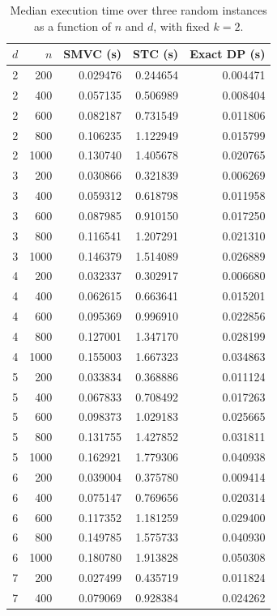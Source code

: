 \begin{table}[t]
\centering
\scriptsize
\caption{Median execution time over three random instances as a function of $n$ and $d$, with fixed $k=2$.}
\label{tab:experiment-4-runtime}
\begin{tabular}{rrrrr}
\toprule
$d$ & $n$ & SMVC (s) & STC (s) & Exact DP (s) \\
\midrule
2 & 200 & 0.029476 & 0.244654 & 0.004471 \\
2 & 400 & 0.057135 & 0.506989 & 0.008404 \\
2 & 600 & 0.082187 & 0.731549 & 0.011806 \\
2 & 800 & 0.106235 & 1.122949 & 0.015799 \\
2 & 1000 & 0.130740 & 1.405678 & 0.020765 \\
3 & 200 & 0.030866 & 0.321839 & 0.006269 \\
3 & 400 & 0.059312 & 0.618798 & 0.011958 \\
3 & 600 & 0.087985 & 0.910150 & 0.017250 \\
3 & 800 & 0.116541 & 1.207291 & 0.021310 \\
3 & 1000 & 0.146379 & 1.514089 & 0.026889 \\
4 & 200 & 0.032337 & 0.302917 & 0.006680 \\
4 & 400 & 0.062615 & 0.663641 & 0.015201 \\
4 & 600 & 0.095369 & 0.996910 & 0.022856 \\
4 & 800 & 0.127001 & 1.347170 & 0.028199 \\
4 & 1000 & 0.155003 & 1.667323 & 0.034863 \\
5 & 200 & 0.033834 & 0.368886 & 0.011124 \\
5 & 400 & 0.067833 & 0.708492 & 0.017263 \\
5 & 600 & 0.098373 & 1.029183 & 0.025665 \\
5 & 800 & 0.131755 & 1.427852 & 0.031811 \\
5 & 1000 & 0.162921 & 1.779306 & 0.040938 \\
6 & 200 & 0.039004 & 0.375780 & 0.009414 \\
6 & 400 & 0.075147 & 0.769656 & 0.020314 \\
6 & 600 & 0.117352 & 1.181259 & 0.029400 \\
6 & 800 & 0.149785 & 1.575733 & 0.040930 \\
6 & 1000 & 0.180780 & 1.913828 & 0.050308 \\
7 & 200 & 0.027499 & 0.435719 & 0.011824 \\
7 & 400 & 0.079069 & 0.928384 & 0.024262 \\

\end{tabular}
\end{table}
